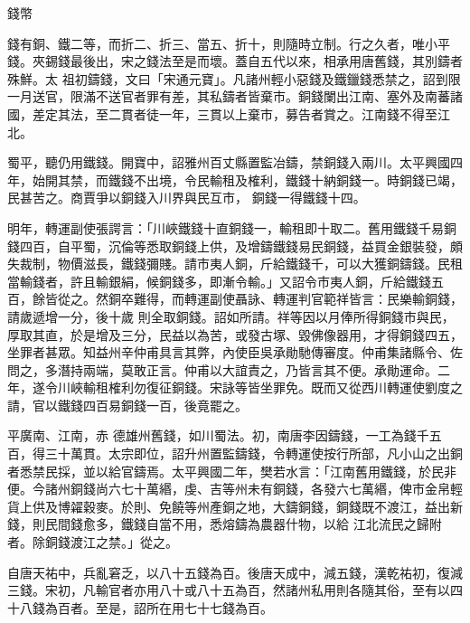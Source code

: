 
\begin{pinyinscope}

 錢幣



 錢有銅、鐵二等，而折二、折三、當五、折十，則隨時立制。行之久者，唯小平錢。夾錫錢最後出，宋之錢法至是而壞。蓋自五代以來，相承用唐舊錢，其別鑄者殊鮮。太
 祖初鑄錢，文曰「宋通元寶」。凡諸州輕小惡錢及鐵鑞錢悉禁之，詔到限一月送官，限滿不送官者罪有差，其私鑄者皆棄市。銅錢闌出江南、塞外及南蕃諸國，差定其法，至二貫者徒一年，三貫以上棄市，募告者賞之。江南錢不得至江北。



 蜀平，聽仍用鐵錢。開寶中，詔雅州百丈縣置監冶鑄，禁銅錢入兩川。太平興國四年，始開其禁，而鐵錢不出境，令民輸租及榷利，鐵錢十納銅錢一。時銅錢已竭，民甚苦之。商賈爭以銅錢入川界與民互市，
 銅錢一得鐵錢十四。



 明年，轉運副使張諤言：「川峽鐵錢十直銅錢一，輸租即十取二。舊用鐵錢千易銅錢四百，自平蜀，沉倫等悉取銅錢上供，及增鑄鐵錢易民銅錢，益買金銀裝發，頗失裁制，物價滋長，鐵錢彌賤。請市夷人銅，斤給鐵錢千，可以大獲銅鑄錢。民租當輸錢者，許且輸銀絹，候銅錢多，即漸令輸。」又詔令市夷人銅，斤給鐵錢五百，餘皆從之。然銅卒難得，而轉運副使聶詠、轉運判官範祥皆言：民樂輸銅錢，請歲遞增一分，後十歲
 則全取銅錢。詔如所請。祥等因以月俸所得銅錢市與民，厚取其直，於是增及三分，民益以為苦，或發古塚、毀佛像器用，才得銅錢四五，坐罪者甚眾。知益州辛仲甫具言其弊，內使臣吳承勛馳傳審度。仲甫集諸縣令、佐問之，多潛持兩端，莫敢正言。仲甫以大誼責之，乃皆言其不便。承勛運命。二年，遂令川峽輸租榷利勿復征銅錢。宋詠等皆坐罪免。既而又從西川轉運使劉度之請，官以鐵錢四百易銅錢一百，後竟罷之。



 平廣南、江南，赤
 德雄州舊錢，如川蜀法。初，南唐李因鑄錢，一工為錢千五百，得三十萬貫。太宗即位，詔升州置監鑄錢，令轉運使按行所部，凡小山之出銅者悉禁民採，並以給官鑄焉。太平興國二年，樊若水言：「江南舊用鐵錢，於民非便。今諸州銅錢尚六七十萬緡，虔、吉等州未有銅錢，各發六七萬緡，俾市金帛輕貨上供及博糴穀麥。於則、免饒等州產銅之地，大鑄銅錢，銅錢既不渡江，益出新錢，則民間錢愈多，鐵錢自當不用，悉熔鑄為農器什物，以給
 江北流民之歸附者。除銅錢渡江之禁。」從之。



 自唐天祐中，兵亂窘乏，以八十五錢為百。後唐天成中，減五錢，漢乾祐初，復減三錢。宋初，凡輸官者亦用八十或八十五為百，然諸州私用則各隨其俗，至有以四十八錢為百者。至是，詔所在用七十七錢為百。




\end{pinyinscope}
